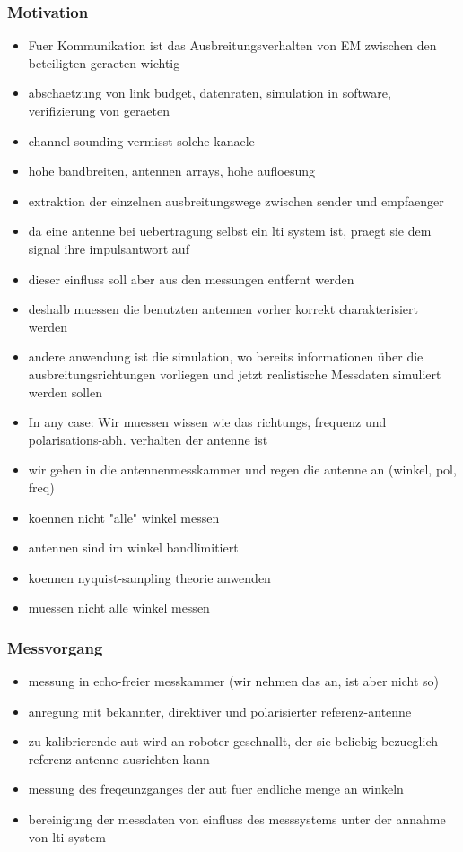 
\subsubsection{Motivation}
\begin{itemize}
    \item Fuer Kommunikation ist das Ausbreitungsverhalten von EM zwischen den beteiligten geraeten wichtig
    \item abschaetzung von link budget, datenraten, simulation in software, verifizierung von geraeten
    \item channel sounding vermisst solche kanaele \cite{thomae2005multidim_hrpe}
    \item hohe bandbreiten, antennen arrays, hohe aufloesung
    \item extraktion der einzelnen ausbreitungswege zwischen sender und empfaenger
    \item da eine antenne bei uebertragung selbst ein \gls{lti} system ist, praegt sie dem signal ihre impulsantwort auf
    \item dieser einfluss soll aber aus den messungen entfernt werden
    \item deshalb muessen die benutzten antennen vorher korrekt charakterisiert werden
    \item andere anwendung ist die simulation, wo bereits informationen \"uber die ausbreitungsrichtungen vorliegen und jetzt realistische Messdaten simuliert werden sollen
    \item In any case: Wir muessen wissen wie das richtungs, frequenz und polarisations-abh. verhalten der antenne ist
    \item wir gehen in die antennenmesskammer und regen die antenne an (winkel, pol, freq)
    \item koennen nicht "alle" winkel messen
    \item antennen sind im winkel bandlimitiert \cite{delgaldo2007phd}
    \item koennen nyquist-sampling theorie anwenden
    \item muessen nicht alle winkel messen
\end{itemize}
\subsubsection{Messvorgang}
\begin{itemize}
    \item messung in echo-freier messkammer (wir nehmen das an, ist aber nicht so)
    \item anregung mit bekannter, direktiver und polarisierter referenz-antenne
    \item zu kalibrierende \gls{aut} wird an roboter geschnallt, der sie beliebig bezueglich referenz-antenne ausrichten kann
    \item messung des freqeunzganges der \gls{aut} fuer endliche menge an winkeln
    \item bereinigung der messdaten von einfluss des messsystems unter der annahme von \gls{lti} system
\end{itemize}
%
%
